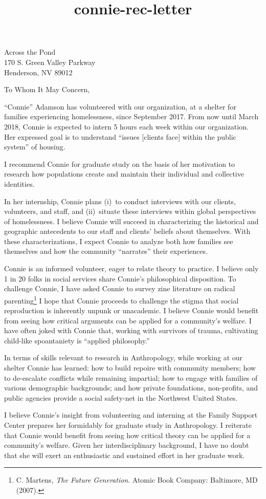 \documentclass[10pt]{letter}
\title{connie-rec-letter}
\begin{document}
\begin{letter}{
	Across the Pond\\
	170 S. Green Valley Parkway\\
	Henderson, NV 89012
}
\opening{To Whom It May Concern,}

``Connie'' Adamson has volunteered with our organization, at a shelter for families experiencing homelessness, since September 2017. From now until March 2018, Connie is expected to intern 5 hours each week within our organization. Her expressed goal is to understand ``issues [clients face] within the public system'' of housing.

I recommend Connie for graduate study on the basis of her motivation to research how populations create and maintain their individual and collective identities. 
	
In her internship, Connie plans (i)~to conduct interviews with our clients, volunteers, and staff, and (ii)~situate these interviews within global perspectives of homelessness. I believe Connie will succeed in characterizing the historical and geographic antecedents to our staff and clients' beliefs about themselves. With these characterizations, I expect Connie to analyze both how families see themselves and how the community ``narrates'' their experiences.

	Connie is an informed volunteer, eager to relate theory to practice. I believe only 1 in 20 folks in social services share Connie's philosophical disposition. To challenge Connie, I have asked Connie to survey zine literature on radical parenting\footnote{C. Martens, \emph{The Future Generation}. Atomic Book Company: Baltimore, MD (2007).} I hope that Connie proceeds to challenge the stigma that social reproduction is inherently unpunk or unacademic. I believe Connie would benefit from seeing how critical arguments can be applied for a community's welfare. I have often joked with Connie that, working with survivors of trauma, cultivating child-like spoantaniety is ``applied philosophy.''

	In terms of skills relevant to research in Anthropology, while working at our shelter Connie has learned:
	how to build repoire with community members;
	how to de-escalate conflicts while remaining impartial; 
	how to engage with families of various demographic backgrounds; and
	how private foundations, non-profits, and public agencies provide a social safety-net in the Northwest United States. 

	I believe Connie's insight from volunteering and interning at the Family Support Center prepares her formidably for graduate study in Anthropology. I reiterate that Connie would benefit from seeing how critical theory can be applied for a community's welfare. Given her interdisciplinary background, I have no doubt that she will exert an enthusiastic and sustained effort in her graduate work.
	

\end{letter}
\end{document}
